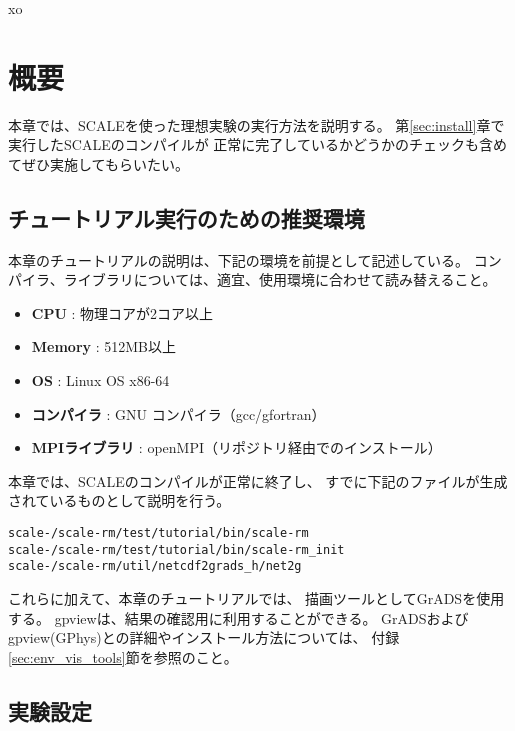 xo
\section{概要}

本章では、SCALEを使った理想実験の実行方法を説明する。
第\ref{sec:install}章で実行したSCALEのコンパイルが
正常に完了しているかどうかのチェックも含めてぜひ実施してもらいたい。


\subsection{チュートリアル実行のための推奨環境} \label{sec:assumed_env}

本章のチュートリアルの説明は、下記の環境を前提として記述している。
コンパイラ、ライブラリについては、適宜、使用環境に合わせて読み替えること。

\begin{itemize}
 \item {\bf CPU} : 物理コアが2コア以上 %
 \item {\bf Memory} : 512MB以上 %
 \item {\bf OS} : Linux OS x86-64  %
 \item {\bf コンパイラ} : GNU コンパイラ（gcc/gfortran）
 \item {\bf MPIライブラリ} : openMPI（リポジトリ経由でのインストール）
\end{itemize}

本章では、SCALEのコンパイルが正常に終了し、
すでに下記のファイルが生成されているものとして説明を行う。
\begin{alltt} 
  scale-{\version}/scale-rm/test/tutorial/bin/scale-rm
  scale-{\version}/scale-rm/test/tutorial/bin/scale-rm_init
  scale-{\version}/scale-rm/util/netcdf2grads_h/net2g
\end{alltt}
これらに加えて、本章のチュートリアルでは、
描画ツールとしてGrADSを使用する。
gpviewは、結果の確認用に利用することができる。
GrADSおよびgpview(GPhys)との詳細やインストール方法については、
付録 \ref{sec:env_vis_tools}節を参照のこと。


\subsection{実験設定} \label{subsec:idealexpsetup}

